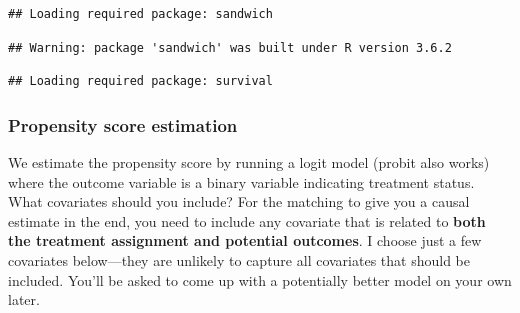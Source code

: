 \documentclass[]{article}
\newenvironment{Shaded}{\begin{snugshade}}{\end{snugshade}}
\newcommand{\CommentTok}[1]{\textcolor[rgb]{0.56,0.35,0.01}{\textit{#1}}}
\newcommand{\DecValTok}[1]{\textcolor[rgb]{0.00,0.00,0.81}{#1}}
\newcommand{\KeywordTok}[1]{\textcolor[rgb]{0.13,0.29,0.53}{\textbf{#1}}}
\newcommand{\NormalTok}[1]{#1}
\newcommand{\OperatorTok}[1]{\textcolor[rgb]{0.81,0.36,0.00}{\textbf{#1}}}
\newcommand{\StringTok}[1]{\textcolor[rgb]{0.31,0.60,0.02}{#1}}
\begin{document}
\begin{verbatim}
## Loading required package: sandwich
\end{verbatim}

\begin{verbatim}
## Warning: package 'sandwich' was built under R version 3.6.2
\end{verbatim}

\begin{verbatim}
## Loading required package: survival
\end{verbatim}

\begin{Shaded}
\end{Shaded}

\hypertarget{propensity-score-estimation}{%
\subsubsection{Propensity score estimation}\label{propensity-score-estimation}}

We estimate the propensity score by running a logit model (probit also works) where the outcome variable is a binary variable indicating treatment status. What covariates should you include? For the matching to give you a causal estimate in the end, you need to include any covariate that is related to \textbf{both the treatment assignment and potential outcomes}. I choose just a few covariates below---they are unlikely to capture all covariates that should be included. You'll be asked to come up with a potentially better model on your own later.
\end{document}

